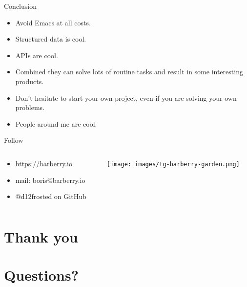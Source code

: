 \documentclass[presentation,aspectratio=169,smaller]{beamer}
\begin{document}
\begin{frame}[label={sec:orgacedfb6}]{Conclusion}
\begin{itemize}
\item Avoid Emacs at all costs.
\item Structured data is cool.
\item APIs are cool.
\item Combined they can solve lots of routine tasks and result in some interesting products.
\item Don't hesitate to start your own project, even if you are solving your own problems.
\item People around me are cool.
\end{itemize}
\end{frame}
\begin{frame}[label={sec:orga8b61ee}]{Follow}
\begin{columns}
\begin{column}{0.5\columnwidth}
\begin{itemize}
\item \url{https://barberry.io}
\item mail: boris@barberry.io
\item @d12frosted on GitHub
\end{itemize}
\end{column}
\begin{column}{0.5\columnwidth}
\begin{center}
\texttt{[image: images/tg-barberry-garden.png]}
\end{center}
\end{column}
\end{columns}
\end{frame}
\section{Thank you}
\label{sec:org5f9cb8e}

\section{Questions?}
\label{sec:orgd7f0526}
\end{document}
